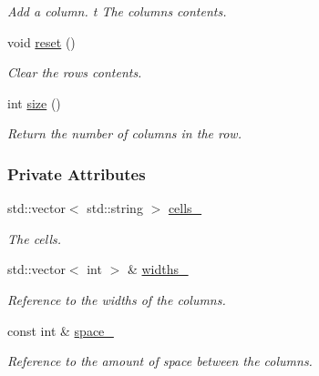 \begin{DoxyCompactItemize}
\begin{DoxyCompactList}\small\item\em Add a column. t The column\textquotesingle{}s contents. \end{DoxyCompactList}\item 
void \hyperlink{structRow_af8954f833585a94810c632c70f6a69d2}{reset} ()\hypertarget{structRow_af8954f833585a94810c632c70f6a69d2}{}\label{structRow_af8954f833585a94810c632c70f6a69d2}

\begin{DoxyCompactList}\small\item\em Clear the row\textquotesingle{}s contents. \end{DoxyCompactList}\item 
int \hyperlink{structRow_aa93c85df542090285f453313d07cdbfd}{size} ()
\begin{DoxyCompactList}\small\item\em Return the number of columns in the row. \end{DoxyCompactList}\end{DoxyCompactItemize}
\subsubsection*{Private Attributes}
\begin{DoxyCompactItemize}
\item 
std\+::vector$<$ std\+::string $>$ \hyperlink{structRow_afc454a86354f797d6d6b379c0ebc7d80}{cells\+\_\+}\hypertarget{structRow_afc454a86354f797d6d6b379c0ebc7d80}{}\label{structRow_afc454a86354f797d6d6b379c0ebc7d80}

\begin{DoxyCompactList}\small\item\em The cells. \end{DoxyCompactList}\item 
std\+::vector$<$ int $>$ \& \hyperlink{structRow_a4b11a114aa8c21cd0cec5414d0521bda}{widths\+\_\+}\hypertarget{structRow_a4b11a114aa8c21cd0cec5414d0521bda}{}\label{structRow_a4b11a114aa8c21cd0cec5414d0521bda}

\begin{DoxyCompactList}\small\item\em Reference to the widths of the columns. \end{DoxyCompactList}\item 
const int \& \hyperlink{structRow_adad7a328328e480df98ef7a78313face}{space\+\_\+}\hypertarget{structRow_adad7a328328e480df98ef7a78313face}{}\label{structRow_adad7a328328e480df98ef7a78313face}

\begin{DoxyCompactList}\small\item\em Reference to the amount of space between the columns. \end{DoxyCompactList}\end{DoxyCompactItemize}
